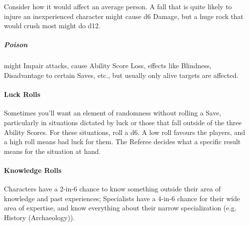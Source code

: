 \documentclass[itdr]{subfiles}
\begin{document}
Consider how it would affect an average person. A fall that is quite likely to injure an inexperienced character might cause d6 Damage, but a huge rock that would crush most might do d12.

\subparagraph{Poison} might Impair attacks, cause Ability Score Loss, effects like Blindness, Disadvantage to certain Saves, etc., but usually only alive targets are affected.

\vfill

\paragraph{Luck Rolls}
Sometimes you'll want an element of randomness without rolling a Save, particularly in situations dictated by luck or those that fall outside of the three Ability Scores. For these situations, roll a d6. A low roll favours the players, and a high roll means bad luck for them. The Referee decides what a specific result means for the situation at hand.

\vfill

\paragraph{Knowledge Rolls}
Characters have a 2-in-6 chance to know something outside their area of knowledge and past experiences; Specialists have a 4-in-6 chance for their wide area of expertise, and know everything about their narrow specialization (e.g. History (Archaeology)).

\vfill
\end{document}
